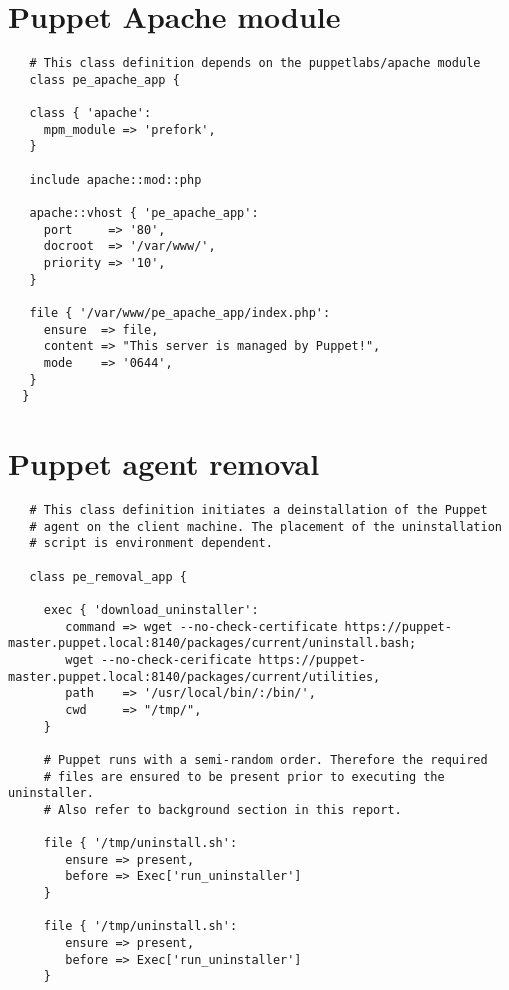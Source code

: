 \begin{appendices}
  \renewcommand\thetable{\thesection\arabic{table}}
  \renewcommand\thefigure{\thesection\arabic{figure}}

  \section{Puppet Apache module} \label{app:puppetmodule}
  \begin{lstlisting}
   # This class definition depends on the puppetlabs/apache module
   class pe_apache_app {

   class { 'apache':
     mpm_module => 'prefork',
   }

   include apache::mod::php

   apache::vhost { 'pe_apache_app':
     port     => '80',
     docroot  => '/var/www/',
     priority => '10',
   }

   file { '/var/www/pe_apache_app/index.php':
     ensure  => file,
     content => "This server is managed by Puppet!",
     mode    => '0644',
   }
  }
  \end{lstlisting}
  \newpage

  \section{Puppet agent removal} \label{app:puppetagent}
  \begin{lstlisting}
   # This class definition initiates a deinstallation of the Puppet
   # agent on the client machine. The placement of the uninstallation
   # script is environment dependent.
       
   class pe_removal_app {

     exec { 'download_uninstaller':
        command => wget --no-check-certificate https://puppet-master.puppet.local:8140/packages/current/uninstall.bash;
        wget --no-check-cerificate https://puppet-master.puppet.local:8140/packages/current/utilities,
        path    => '/usr/local/bin/:/bin/',
        cwd     => "/tmp/",
     }     

     # Puppet runs with a semi-random order. Therefore the required 
     # files are ensured to be present prior to executing the uninstaller. 
     # Also refer to background section in this report.
 
     file { '/tmp/uninstall.sh': 
        ensure => present,
        before => Exec['run_uninstaller'] 
     }

     file { '/tmp/uninstall.sh': 
        ensure => present,      
        before => Exec['run_uninstaller']                  
     }


\end{lstlisting}
\end{appendices}
